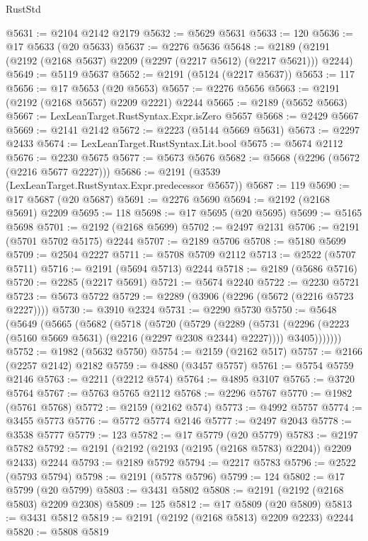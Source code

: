 \begin{lexlean}{RustStd}
\begin{coremodule}
@5631 := @2104 @2142 @2179
@5632 := @5629 @5631
@5633 := 120
@5636 := @17 @5633 (@20 @5633)
@5637 := @2276 @5636
@5648 := @2189 (@2191 (@2192 (@2168 @5637) @2209 (@2297 (@2217 @5612) (@2217 @5621))) @2244)
@5649 := @5119 @5637
@5652 := @2191 (@5124 (@2217 @5637))
@5653 := 117
@5656 := @17 @5653 (@20 @5653)
@5657 := @2276 @5656
@5663 := @2191 (@2192 (@2168 @5657) @2209 @2221) @2244
@5665 := @2189 (@5652 @5663)
@5667 := LexLeanTarget.RustSyntax.Expr.isZero @5657
@5668 := @2429 @5667
@5669 := @2141 @2142
@5672 := @2223 (@5144 @5669 @5631)
@5673 := @2297 @2433
@5674 := LexLeanTarget.RustSyntax.Lit.bool
@5675 := @5674 @2112
@5676 := @2230 @5675
@5677 := @5673 @5676
@5682 := @5668 (@2296 (@5672 (@2216 @5677 @2227)))
@5686 := @2191 (@3539 (LexLeanTarget.RustSyntax.Expr.predecessor @5657))
@5687 := 119
@5690 := @17 @5687 (@20 @5687)
@5691 := @2276 @5690
@5694 := @2192 (@2168 @5691) @2209
@5695 := 118
@5698 := @17 @5695 (@20 @5695)
@5699 := @5165 @5698
@5701 := @2192 (@2168 @5699)
@5702 := @2497 @2131
@5706 := @2191 (@5701 @5702 @5175) @2244
@5707 := @2189 @5706
@5708 := @5180 @5699
@5709 := @2504 @2227
@5711 := @5708 @5709 @2112
@5713 := @2522 (@5707 @5711)
@5716 := @2191 (@5694 @5713) @2244
@5718 := @2189 (@5686 @5716)
@5720 := @2285 (@2217 @5691)
@5721 := @5674 @2240
@5722 := @2230 @5721
@5723 := @5673 @5722
@5729 := @2289 (@3906 (@2296 (@5672 (@2216 @5723 @2227))))
@5730 := @3910 @2324
@5731 := @2290 @5730
@5750 := @5648
    (@5649
      (@5665
        (@5682
          (@5718
            (@5720
              (@5729
                (@2289
                  (@5731 (@2296 (@2223 (@5160 @5669 @5631) (@2216 (@2297 @2308 @2344) @2227))))
                  @3405)))))))
@5752 := @1982 (@5632 @5750)
@5754 := @2159 (@2162 @517)
@5757 := @2166 (@2257 @2142) @2182
@5759 := @4880 (@3457 @5757)
@5761 := @5754 @5759 @2146
@5763 := @2211 (@2212 @574)
@5764 := @4895 @3107
@5765 := @3720 @5764
@5767 := @5763 @5765 @2112
@5768 := @2296 @5767
@5770 := @1982 (@5761 @5768)
@5772 := @2159 (@2162 @574)
@5773 := @4992 @5757
@5774 := @3455 @5773
@5776 := @5772 @5774 @2146
@5777 := @2497 @2043
@5778 := @3538 @5777
@5779 := 123
@5782 := @17 @5779 (@20 @5779)
@5783 := @2197 @5782
@5792 := @2191 (@2192 (@2193 (@2195 (@2168 @5783) @2204)) @2209 @2433) @2244
@5793 := @2189 @5792
@5794 := @2217 @5783
@5796 := @2522 (@5793 @5794)
@5798 := @2191 (@5778 @5796)
@5799 := 124
@5802 := @17 @5799 (@20 @5799)
@5803 := @3431 @5802
@5808 := @2191 (@2192 (@2168 @5803) @2209 @2308)
@5809 := 125
@5812 := @17 @5809 (@20 @5809)
@5813 := @3431 @5812
@5819 := @2191 (@2192 (@2168 @5813) @2209 @2233) @2244
@5820 := @5808 @5819

\end{coremodule}
\end{lexlean}

